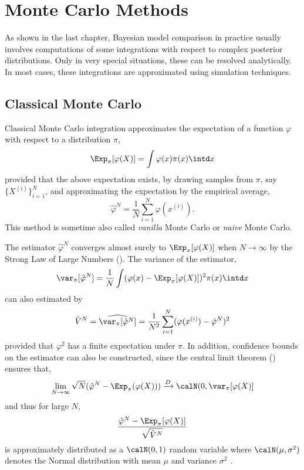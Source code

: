 \chapter{Monte Carlo Methods}
\label{cha:Monte Carlo Methods}

As shown in the last chapter, Bayesian model comparison in practice usually
involves computations of some integrations with respect to complex posterior
distributions. Only in very special situations, these can be resolved
analytically. In most cases, these integrations are approximated using
simulation techniques.

\section{Classical Monte Carlo}
\label{sec:Classical Monte Carlo}

Classical Monte Carlo integration approximates the expectation of a function
$\varphi$ with respect to a distribution $\pi$,
\begin{equation}
  \Exp_{\pi}[\varphi(X)] = \int\varphi(x)\pi(x)\intd x
\end{equation}
provided that the above expectation exists, by drawing \iid samples from
$\pi$, say $\{X^{(i)}\}_{i=1}^N$, and approximating the expectation by the
empirical average,
\begin{equation}
  \hat\varphi^N = \frac{1}{N}\sum_{i=1}^N\varphi(x^{(i)}).
  \label{eq:vanilla mc}
\end{equation}
This method is sometime also called \emph{vanilla} Monte Carlo or \emph{naive}
Monte Carlo.

The estimator $\hat\varphi^N$ converges almost surely to
$\Exp_{\pi}[\varphi(X)]$ when $N\to\infty$ by the Strong Law of Large Numbers
(\slln). The variance of the estimator,
\begin{equation}
  \var_{\pi}[\hat\varphi^N] =
  \frac{1}{N} \int (\varphi(x) - \Exp_{\pi}[\varphi(X)])^2 \pi(x) \intd x
\end{equation}
can also estimated by
\begin{equation}
  \hat{V}^N = \widehat{\var_{\pi}[\hat\varphi^N]} =
  \frac{1}{N^2} \sum_{i=1}^N (\varphi(x^{(i)}) - \hat\varphi^N)^2
\end{equation}
provided that $\varphi^2$ has a finite expectation under $\pi$. In addition,
confidence bounds on the estimator can also be constructed, since the central
limit theorem (\clt) ensures that,
\begin{equation}
  \lim_{N\to\infty} \sqrt{N} (\hat\varphi^N - \Exp_{\pi}(\varphi(X)))
  \xrightarrow{D} \calN(0, \var_{\pi}[\varphi(X)]
\end{equation}
and thus for large $N$,
\begin{equation}
  \frac{\hat\varphi^N - \Exp_{\pi}[\varphi(X)]}{\sqrt{\hat{V}^N}}
\end{equation}
is approximately distributed as a $\calN(0, 1)$ random variable where
$\calN(\mu,\sigma^2)$ denotes the Normal distribution with mean $\mu$ and
variance $\sigma^2$ \cite[][sec.~3.2]{Robert:2004tn}.

